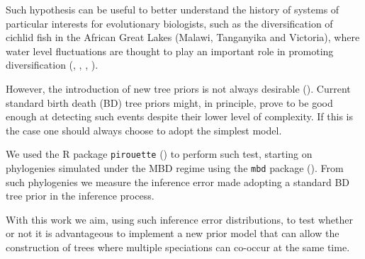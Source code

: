 Such hypothesis can be useful to better understand the history of systems of particular interests for evolutionary biologists, such as the diversification of cichlid fish in the African Great Lakes (Malawi, Tanganyika and Victoria), where water level fluctuations are thought to play an important role in promoting diversification (\citep{verheyen1996mitochondrial}, \citep{sturmbauer2001lake}, \citep{janzen2016}, \citep{janzen2017}).

However, the introduction of new tree priors is not always desirable (\citep{bilderbeek2019pirouette}). Current standard birth death (BD) tree priors might, in principle, prove to be good enough at detecting such events despite their lower level of complexity.
If this is the case one should always choose to adopt the simplest model.

We used the R package \verb;pirouette; (\citep{pirouette}) to perform such test, starting on phylogenies simulated under the MBD regime using the \verb;mbd; package (\citep{mbd}).
From such phylogenies we measure the inference error made adopting a standard BD tree prior in the inference process.

With this work we aim, using such inference error distributions, to test whether or not it is advantageous to implement a new prior model that can allow the construction of trees where multiple speciations can co-occur at the same time.
